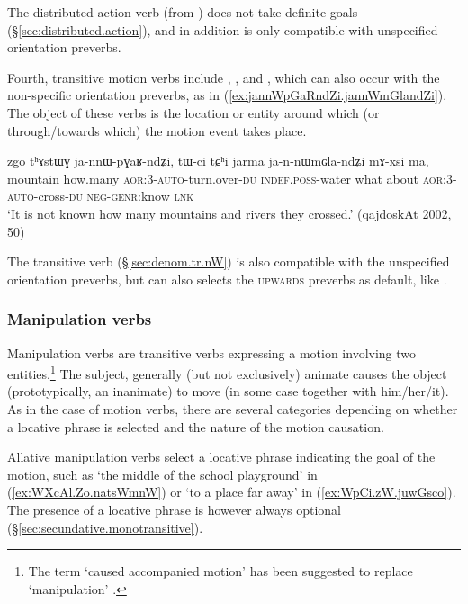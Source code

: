 The distributed action verb  (from ) does not take definite goals (§\ref{sec:distributed.action}), and in addition is only compatible with unspecified orientation preverbs.

Fourth, transitive motion verbs include , ,  and , which can also occur with the non-specific orientation preverbs, as in (\ref{ex:jannWpGaRndZi.jannWmGlandZi}). The object of these verbs is the location or entity around which (or through/towards which) the motion event takes place.
 
\begin{exe}
\ex \label{ex:jannWpGaRndZi.jannWmGlandZi}
\gll  zgo tʰɤstɯɣ ja-nnɯ-pɣaʁ-ndʑi, tɯ-ci tɕʰi jarma ja-n-nɯmɢla-ndʑi mɤ-xsi ma, \\
 mountain how.many \textsc{aor}:3\flobv{}-\textsc{auto}-turn.over-\textsc{du} \textsc{indef}.\textsc{poss}-water what about \textsc{aor}:3\flobv{}-\textsc{auto}-cross-\textsc{du} \textsc{neg}-\textsc{genr}:know \textsc{lnk} \\
\glt `It is not known how many mountains and rivers they crossed.'  (qajdoskAt 2002, 50)
\end{exe}  

The transitive verb  (§\ref{sec:denom.tr.nW}) is also compatible with the unspecified orientation preverbs, but can also selects the \textsc{upwards} preverbs as default, like .

\subsubsection{Manipulation verbs} \label{sec:manipulation.verbs}
Manipulation verbs are transitive verbs expressing a motion involving two entities.\footnote{The term `caused accompanied motion' has been suggested to replace `manipulation' \citep{margetts19bring}. } The subject, generally (but not exclusively) animate causes the object (prototypically, an inanimate) to move (in some case together with him/her/it). As in the case of motion verbs, there are several categories depending on whether a locative phrase is selected and the nature of the motion causation.

Allative manipulation verbs select a locative phrase indicating the goal of the motion, such as  `the middle of the school playground' in (\ref{ex:WXcAl.Zo.natsWmnW}) or  `to a place far away' in (\ref{ex:WpCi.zW.juwGsco}). The presence of a locative phrase is however always optional (§\ref{sec:secundative.monotransitive}).

